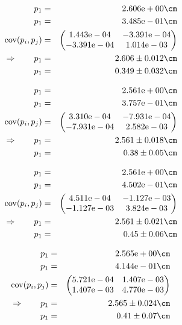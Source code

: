 \begin{eqnarray}
    p_1 &=& 2.606\mathrm{e}+00 \cm \nonumber \\
    p_1 &=& 3.485\mathrm{e}-01 \cm \nonumber \\
    \mathrm{cov}(p_i, p_j) &=& 
    \begin{pmatrix}
        1.443\mathrm{e}-04 &-3.391\mathrm{e}-04 \\
        -3.391\mathrm{e}-04 &1.014\mathrm{e}-03 \\
    \end{pmatrix}
\\ \Rightarrow \qquad
    p_1 &=& 2.606 \pm 0.012 \cm\\
    p_1 &=& 0.349 \pm 0.032 \cm
\end{eqnarray}

\begin{eqnarray}
    p_1 &=& 2.561\mathrm{e}+00 \cm \nonumber \\
    p_1 &=& 3.757\mathrm{e}-01 \cm \nonumber \\
    \mathrm{cov}(p_i, p_j) &=& 
    \begin{pmatrix}
        3.310\mathrm{e}-04 &-7.931\mathrm{e}-04 \\
        -7.931\mathrm{e}-04 &2.582\mathrm{e}-03 \\
    \end{pmatrix}
\\ \Rightarrow \qquad
    p_1 &=& 2.561 \pm 0.018 \cm\\
    p_1 &=& 0.38 \pm 0.05 \cm
\end{eqnarray}

\begin{eqnarray}
    p_1 &=& 2.561\mathrm{e}+00 \cm \nonumber \\
    p_1 &=& 4.502\mathrm{e}-01 \cm \nonumber \\
    \mathrm{cov}(p_i, p_j) &=& 
    \begin{pmatrix}
        4.511\mathrm{e}-04 &-1.127\mathrm{e}-03 \\
        -1.127\mathrm{e}-03 &3.824\mathrm{e}-03 \\
    \end{pmatrix}
\\ \Rightarrow \qquad
    p_1 &=& 2.561 \pm 0.021 \cm\\
    p_1 &=& 0.45 \pm 0.06 \cm
\end{eqnarray}

\begin{eqnarray}
    p_1 &=& 2.565\mathrm{e}+00 \cm \nonumber \\
    p_1 &=& 4.144\mathrm{e}-01 \cm \nonumber \\
    \mathrm{cov}(p_i, p_j) &=& 
    \begin{pmatrix}
        5.721\mathrm{e}-04 &1.407\mathrm{e}-03 \\
        1.407\mathrm{e}-03 &4.770\mathrm{e}-03 \\
    \end{pmatrix}
\\ \Rightarrow \qquad
    p_1 &=& 2.565 \pm 0.024 \cm\\
    p_1 &=& 0.41 \pm 0.07 \cm
\end{eqnarray}

